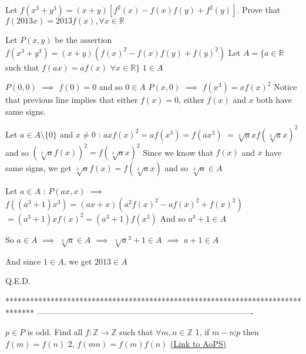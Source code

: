 \begin{solution}
	\begin{tcolorbox}Let $f(x^3+y^3)=(x+y)[f^2(x)-f(x)f(y)+f^2(y)]$. Prove that $f(2013x)=2013f(x),\forall x\in\mathbb{R} $\end{tcolorbox}
Let $P(x,y)$ be the assertion $f(x^3+y^3)=(x+y)(f(x)^2-f(x)f(y)+f(y)^2)$
Let $A=\{a\in\mathbb R$ such that $f(ax)=af(x)$ $\forall x\in\mathbb R\}$
$1\in A$

$P(0,0)$ $\implies$ $f(0)=0$ and so $0\in A$
$P(x,0)$ $\implies$ $f(x^3)=xf(x)^2$
Notice that previous line implies that either $f(x)=0$, either $f(x)$ and $x$ both have same signs.

Let $a\in A\setminus\{0\}$ and $x\ne 0$ : $axf(x)^2=af(x^3)=f(ax^3)$ $=\sqrt[3]axf(\sqrt[3]ax)^2$ and so $(\sqrt[3]af(x))^2=f(\sqrt[3]ax)^2$
Since we know that $f(x)$ and $x$ have same signs, we get $\sqrt[3]af(x)=f(\sqrt[3]ax)$ and so $\sqrt[3]a\in A$

Let $a\in A$ : $P(ax,x)$ $\implies$ $f((a^3+1)x^3)=(ax+x)(a^2f(x)^2-af(x)^2+f(x)^2)$ $=(a^3+1)xf(x)^2=(a^3+1)f(x^3)$
And so $a^3+1\in A$

So $a\in A$ $\implies$ $\sqrt[3]a\in A$ $\implies$ $\sqrt[3]a^3+1\in A$ $\implies$ $a+1\in A$

And since $1\in A$, we get $2013\in A$

Q.E.D.
\end{solution}
*******************************************************************************
-------------------------------------------------------------------------------

\begin{problem}
	$p \in P$ is odd. Find all $f:\mathbb{Z} \to \mathbb{Z}$ such that $\forall m,n \in \mathbb{Z}$
1, if $m -n \vdots p$ then $f(m)=f(n)$
2, $f(mn)=f(m)f(n)$
	\flushright \href{https://artofproblemsolving.com/community/c6h559451}{(Link to AoPS)}
\end{problem}



